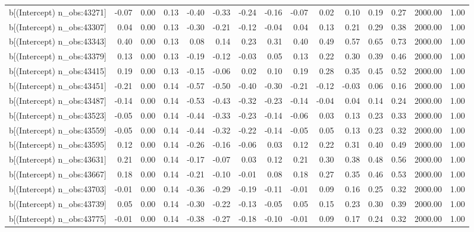 \begin{table}[ht]
\begin{tabular}{rrrrrrrrrrrrrrr}
  b[(Intercept) n\_obs:43271] & -0.07 & 0.00 & 0.13 & -0.40 & -0.33 & -0.24 & -0.16 & -0.07 & 0.02 & 0.10 & 0.19 & 0.27 & 2000.00 & 1.00 \\ 
  b[(Intercept) n\_obs:43307] & 0.04 & 0.00 & 0.13 & -0.30 & -0.21 & -0.12 & -0.04 & 0.04 & 0.13 & 0.21 & 0.29 & 0.38 & 2000.00 & 1.00 \\ 
  b[(Intercept) n\_obs:43343] & 0.40 & 0.00 & 0.13 & 0.08 & 0.14 & 0.23 & 0.31 & 0.40 & 0.49 & 0.57 & 0.65 & 0.73 & 2000.00 & 1.00 \\ 
  b[(Intercept) n\_obs:43379] & 0.13 & 0.00 & 0.13 & -0.19 & -0.12 & -0.03 & 0.05 & 0.13 & 0.22 & 0.30 & 0.39 & 0.46 & 2000.00 & 1.00 \\ 
  b[(Intercept) n\_obs:43415] & 0.19 & 0.00 & 0.13 & -0.15 & -0.06 & 0.02 & 0.10 & 0.19 & 0.28 & 0.35 & 0.45 & 0.52 & 2000.00 & 1.00 \\ 
  b[(Intercept) n\_obs:43451] & -0.21 & 0.00 & 0.14 & -0.57 & -0.50 & -0.40 & -0.30 & -0.21 & -0.12 & -0.03 & 0.06 & 0.16 & 2000.00 & 1.00 \\ 
  b[(Intercept) n\_obs:43487] & -0.14 & 0.00 & 0.14 & -0.53 & -0.43 & -0.32 & -0.23 & -0.14 & -0.04 & 0.04 & 0.14 & 0.24 & 2000.00 & 1.00 \\ 
  b[(Intercept) n\_obs:43523] & -0.05 & 0.00 & 0.14 & -0.44 & -0.33 & -0.23 & -0.14 & -0.06 & 0.03 & 0.13 & 0.23 & 0.33 & 2000.00 & 1.00 \\ 
  b[(Intercept) n\_obs:43559] & -0.05 & 0.00 & 0.14 & -0.44 & -0.32 & -0.22 & -0.14 & -0.05 & 0.05 & 0.13 & 0.23 & 0.32 & 2000.00 & 1.00 \\ 
  b[(Intercept) n\_obs:43595] & 0.12 & 0.00 & 0.14 & -0.26 & -0.16 & -0.06 & 0.03 & 0.12 & 0.22 & 0.31 & 0.40 & 0.49 & 2000.00 & 1.00 \\ 
  b[(Intercept) n\_obs:43631] & 0.21 & 0.00 & 0.14 & -0.17 & -0.07 & 0.03 & 0.12 & 0.21 & 0.30 & 0.38 & 0.48 & 0.56 & 2000.00 & 1.00 \\ 
  b[(Intercept) n\_obs:43667] & 0.18 & 0.00 & 0.14 & -0.21 & -0.10 & -0.01 & 0.08 & 0.18 & 0.27 & 0.35 & 0.46 & 0.53 & 2000.00 & 1.00 \\ 
  b[(Intercept) n\_obs:43703] & -0.01 & 0.00 & 0.14 & -0.36 & -0.29 & -0.19 & -0.11 & -0.01 & 0.09 & 0.16 & 0.25 & 0.32 & 2000.00 & 1.00 \\ 
  b[(Intercept) n\_obs:43739] & 0.05 & 0.00 & 0.14 & -0.30 & -0.22 & -0.13 & -0.05 & 0.05 & 0.15 & 0.23 & 0.30 & 0.39 & 2000.00 & 1.00 \\ 
  b[(Intercept) n\_obs:43775] & -0.01 & 0.00 & 0.14 & -0.38 & -0.27 & -0.18 & -0.10 & -0.01 & 0.09 & 0.17 & 0.24 & 0.32 & 2000.00 & 1.00 \\ 

\end{tabular}
\end{table}
